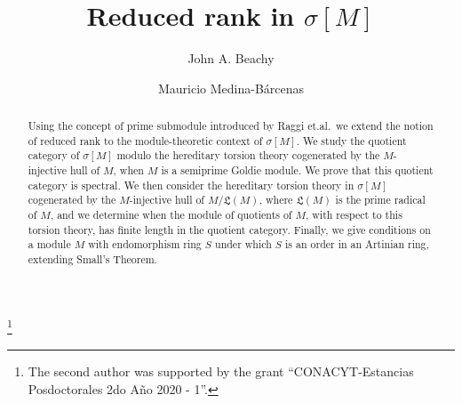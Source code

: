 \documentclass{amsart}
\theoremstyle{definition}
\theoremstyle{remark}
\numberwithin{equation}{section}
\newcommand{\sm}{\sigma[M]}
\begin{document}
	
	\title{Reduced rank in $\sm$}
	
	\author{John A. Beachy}
	\address{Department of Mathematical Sciences, Northern Illinois University,
		DeKalb 60115, Illinois, US}
	
	\author{Mauricio Medina-B\'arcenas}
	\address{Departamento de Matem\'{a}ticas, 
		Universidad Autónoma Metropolitana-Iztapalapa,
		Sn. Rafael Atlixco 186, Col. Vicentina 09340
		Ciudad de México, M\'{e}xico}
	\thanks{The second author was supported by the grant ``CONACYT-Estancias Posdoctorales 2do A\~no 2020 - 1''.}
	
	
	
	\date{}
	
	
	
	\begin{abstract}
		Using the concept of prime submodule 
		introduced by Raggi et.al.\ 
		we extend the notion of reduced rank to the module-theoretic context of $\sm$. 
		We study the quotient category of $\sm$ 
		modulo the hereditary torsion theory 
		cogenerated by the $M$-injective hull of $M$,
		when $M$ is a semiprime Goldie module. 
		We prove that this quotient category is spectral. 
		We then consider the hereditary torsion theory in $\sm$ 
		cogenerated by the $M$-injective hull of $M/\mathfrak{L}(M)$, 
		where $\mathfrak{L}(M)$ is the prime radical of $M$, 
		and we determine when the module of quotients of $M$, 
		with respect to this torsion theory, 
		has finite length in the quotient category. 
		Finally, we give conditions on a module $M$ with endomorphism ring $S$ 
		under which $S$ is an order in an Artinian ring, 
		extending Small's Theorem.
	\end{abstract}
	
\end{document}
